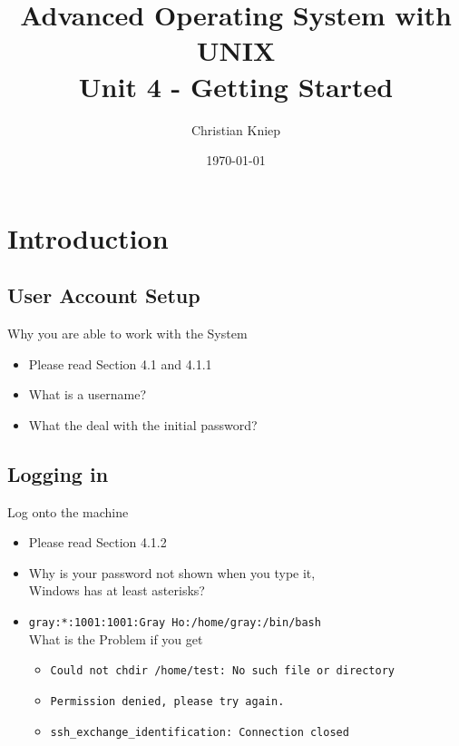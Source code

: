 \documentclass[hyperref={pdfpagelabels=false}]{beamer}
\author{Christian Kniep}
\newcommand{\code}[1]{\colorbox{lGray}{\texttt{#1}}}
\begin{document}
\title{Advanced Operating System with UNIX \\ Unit 4 - Getting Started}  
\date[\today]{\today} 

\begin{frame}
	\titlepage
\end{frame} 


\section{Introduction} 
	\subsection{User Account Setup}
		\begin{frame}{Why you are able to work with the System}
			\begin{itemize}
				\item<1-> Please read Section 4.1 and 4.1.1
                \item<2-> What is a username?
                \item<3-> What the deal with the initial password?
            \end{itemize}
		\end{frame}
	\subsection{Logging in}
		\begin{frame}{Log onto the machine}
			\begin{itemize}
				\item<1-> Please read Section 4.1.2
                \item<2-> Why is your password not shown when you type it, \\
                            Windows has at least asterisks?
                \item<3-> \code{gray:*:1001:1001:Gray Ho:/home/gray:/bin/bash} \\
                            What is the Problem if you get
                \begin{itemize}
                    \item<4-> \code{Could not chdir /home/test: No such file or directory}
                    \item<5-> \code{Permission denied, please try again.}
                    \item<6-> \code{ssh\_exchange\_identification: Connection closed}
                \end{itemize}
            \end{itemize}
		\end{frame}
\end{document}
